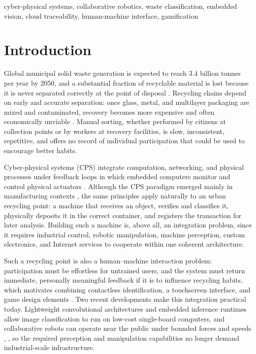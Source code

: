 \documentclass[conference]{IEEEtran}
\begin{document}
\begin{IEEEkeywords}
cyber-physical systems, collaborative robotics, waste classification, embedded vision, cloud traceability, human-machine interface, gamification
\end{IEEEkeywords}

\section{Introduction}
Global municipal solid waste generation is expected to reach 3.4 billion tonnes per year by 2050, and a substantial fraction of recyclable material is lost because it is never separated correctly at the point of disposal \cite{b1}. Recycling chains depend on early and accurate separation: once glass, metal, and multilayer packaging are mixed and contaminated, recovery becomes more expensive and often economically unviable \cite{b1}. Manual sorting, whether performed by citizens at collection points or by workers at recovery facilities, is slow, inconsistent, repetitive, and offers no record of individual participation that could be used to encourage better habits.

Cyber-physical systems (CPS) integrate computation, networking, and physical processes under feedback loops in which embedded computers monitor and control physical actuators \cite{b2}. Although the CPS paradigm emerged mainly in manufacturing contexts \cite{b3}, the same principles apply naturally to an urban recycling point: a machine that receives an object, verifies and classifies it, physically deposits it in the correct container, and registers the transaction for later analysis. Building such a machine is, above all, an integration problem, since it requires industrial control, robotic manipulation, machine perception, custom electronics, and Internet services to cooperate within one coherent architecture.

Such a recycling point is also a human--machine interaction problem: participation must be effortless for untrained users, and the system must return immediate, personally meaningful feedback if it is to influence recycling habits, which motivates combining contactless identification, a touchscreen interface, and game design elements \cite{b12}. Two recent developments make this integration practical today. Lightweight convolutional architectures \cite{b7} and embedded inference runtimes \cite{b9} allow image classification to run on low-cost single-board computers, and collaborative robots can operate near the public under bounded forces and speeds \cite{b10}, \cite{b11}, so the required perception and manipulation capabilities no longer demand industrial-scale infrastructure.
\end{document}
